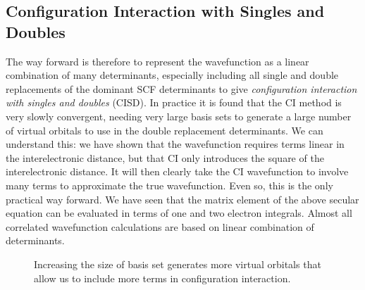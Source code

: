 \documentclass{article}
\theoremstyle{plain}\theoremheaderfont{\normalfont\itshape}\theorembodyfont{\rmfamily}\theoremseparator{.}\newtheorem*{rem}{Remark}\newtheorem*{ex}{Example}\newtheorem*{proof}{Proof}\newtheorem*{altp}{Alternative proof}
\theoremstyle{plain}\theoremheaderfont{\normalfont\bfseries}\theorembodyfont{\rmfamily}\theoremseparator{.}\newtheorem{thm}{Theorem}[section]\newtheorem{lem}[thm]{Lemma}\newtheorem{prop}[thm]{Proposition}\newtheorem*{cor}{Corollary}\newtheorem{defn}[thm]{Definition}\newtheorem{clm}[thm]{Claim}\newtheorem{clminproof}{Claim}
\theoremstyle{break}\theoremheaderfont{\normalfont\itshape}\theorembodyfont{\rmfamily}\theoremseparator{.\medskip}\newtheorem*{proofskip}{Proof}\newtheorem*{exs}{Examples}\newtheorem*{rems}{Remarks}
\theoremstyle{break}\theoremheaderfont{\normalfont\bfseries}\theorembodyfont{\rmfamily}\theoremseparator{.\medskip}\newtheorem{lemskip}[thm]{Lemma}\newtheorem{defnskip}[thm]{Definition}\newtheorem{propskip}[thm]{Proposition}\newtheorem{thmskip}[thm]{Theorem}
\numberwithin{equation}{section}
\newcommand{\x}{_{\text{x}}}
\begin{document}
    \subsection{Configuration Interaction with Singles and Doubles}
    The way forward is therefore to represent the wavefunction as a linear combination of many determinants, especially including all single and double replacements of the dominant SCF determinants to give \textit{configuration interaction with singles and doubles} (CISD). In practice it is found that the CI method is very slowly convergent, needing very large basis sets to generate a large number of virtual orbitals to use in the double replacement determinants. We can understand this: we have shown that the wavefunction requires terms linear in the interelectronic distance, but that CI only introduces the square of the interelectronic distance. It will then clearly take the CI wavefunction to involve many terms to approximate the true wavefunction. Even so, this is the only practical way forward. We have seen that the matrix element of the above secular equation can be evaluated in terms of one and two electron integrals. Almost all correlated wavefunction calculations are based on linear combination of determinants.

    \begin{figure}[ht!]
        \centering
        \caption{Increasing the size of basis set generates more virtual orbitals that allow us to include more terms in configuration interaction.}
    \end{figure}
\end{document}
